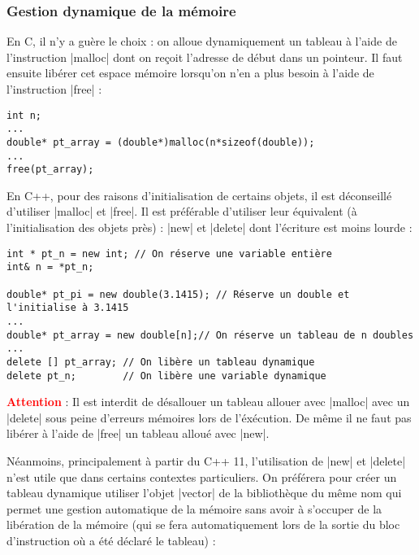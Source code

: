 \subsubsection{Gestion dynamique de la mémoire}

En C, il n'y a guère le choix : on alloue dynamiquement un tableau à l'aide de l'instruction |malloc| dont on reçoit l'adresse de début dans un pointeur. Il faut ensuite libérer cet espace mémoire lorsqu'on n'en a plus besoin à l'aide de l'instruction |free| :

\begin{lstlisting}
int n;
...
double* pt_array = (double*)malloc(n*sizeof(double));
...
free(pt_array);
\end{lstlisting}

En C++, pour des raisons d'initialisation de certains objets, il est déconseillé d'utiliser |malloc| et |free|. Il est préférable d'utiliser leur équivalent (à l'initialisation des objets près) : |new| et |delete| dont l'écriture est moins lourde :
\begin{lstlisting}[caption=Exemple d'utilisation de new et delete]
int * pt_n = new int; // On réserve une variable entière
int& n = *pt_n;

double* pt_pi = new double(3.1415); // Réserve un double et l'initialise à 3.1415
...
double* pt_array = new double[n];// On réserve un tableau de n doubles
...
delete [] pt_array; // On libère un tableau dynamique
delete pt_n;        // On libère une variable dynamique
\end{lstlisting}

\textbf{\textcolor{red}{Attention}} : Il est interdit de désallouer un tableau allouer avec |malloc| avec un |delete| sous peine d'erreurs mémoires lors de l'éxécution. De même il ne faut pas libérer à l'aide de |free| un tableau alloué avec |new|.

Néanmoins, principalement à partir du C++ 11, l'utilisation de |new| et |delete| n'est utile que dans certains contextes particuliers. On préférera pour créer un tableau dynamique utiliser l'objet |vector| de la bibliothèque du même nom qui permet une gestion automatique de la mémoire sans avoir à s'occuper de la libération de la mémoire (qui se fera automatiquement lors de la sortie du bloc d'instruction où a été déclaré le tableau) :

